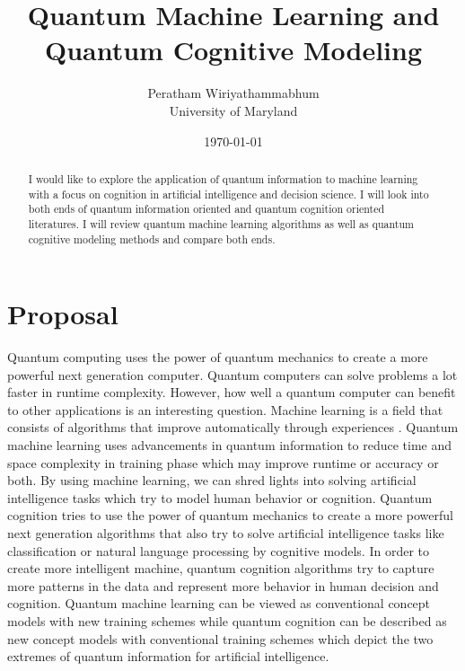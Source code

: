 \documentclass[11pt]{article}
\begin{document}

\title{Quantum Machine Learning and Quantum Cognitive Modeling}

\author{Peratham Wiriyathammabhum \\
University of Maryland}

\date{\today}
\maketitle

\begin{abstract}
I would like to explore the application of quantum information to machine learning with a focus on cognition in artificial intelligence and decision science. I will look into both ends of quantum information oriented and quantum cognition oriented literatures. I will review quantum machine learning algorithms as well as quantum cognitive modeling methods and compare both ends.
\end{abstract}

\section*{Proposal}
\label{sec:proposal}
Quantum computing uses the power of quantum mechanics to create a more powerful next generation computer. Quantum computers can solve problems a lot faster in runtime complexity. However, how well a quantum computer can benefit to other applications is an interesting question. Machine learning is a field that consists of algorithms that improve automatically through experiences \cite{mitchell1997machine}. Quantum machine learning \cite{aaronsonquantum, wiebe2015quantum, wiebe2014quantum_a, wiebe2014quantum_b, rebentrost2014quantum, schuld2015introduction,lloyd2013quantum} uses advancements in quantum information to reduce time and space complexity in training phase which may improve runtime or accuracy or both. By using machine learning, we can shred lights into solving artificial intelligence tasks which try to model human behavior or cognition. Quantum cognition \cite{busemeyer2012quantum, aertsquantum} tries to use the power of quantum mechanics to create a more powerful next generation algorithms that also try to solve artificial intelligence tasks like classification \cite{busemeyer2012quantum} or natural language processing \cite{aerts2013quantum,  kartsaklis2014study} by cognitive models.  In order to create more intelligent machine, quantum cognition algorithms try to capture more patterns in the data and represent more behavior in human decision and cognition. Quantum machine learning can be viewed as conventional concept models with new training schemes while quantum cognition can be described as new concept models with conventional training schemes which depict the two extremes of quantum information for artificial intelligence. 
\end{document}
